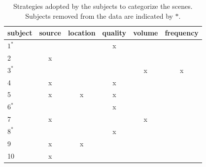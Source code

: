 \documentclass[twoside,twocolumn]{article}
\begin{document}
\setlength\tabcolsep{0.7mm}
\begin{table}[t]
 \centering
{\renewcommand{\arraystretch}{0.9}
\begin{tabular}{lccccc}
subject & source & location & quality & volume & frequency  \\
\hline
    $1^*$&        &          &    x    &        &           \\
    2    &   x    &          &         &        &           \\
    $3^*$&        &          &         &    x   &     x     \\
    4    &   x    &          &    x    &        &           \\
    5    &   x    &    x     &    x    &        &           \\        
    $6^*$&        &          &    x    &        &           \\
    7    &   x    &          &         &    x   &           \\
    $8^*$&        &          &    x    &        &           \\
    9    &   x    &    x     &         &        &           \\
    10   &   x    &          &         &        &           \\
\hline
\end{tabular}
}
\vspace{0.5mm}
\caption{\label{tab:StratSate} Strategies adopted by the subjects to categorize the scenes. Subjects removed from the data are indicated by $*$.}
\end{table}
\end{document}
